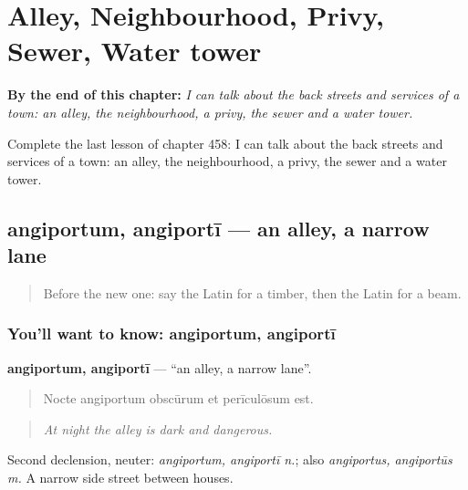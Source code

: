 
\chapter{Alley, Neighbourhood, Privy, Sewer, Water tower}
\label{ch:la-alley-neighbourhood-privy-sewer-water-tower}

\begin{chapteropening}
\textbf{By the end of this chapter:} \emph{I can talk about the back streets and services of a town: an alley, the neighbourhood, a privy, the sewer and a water tower.}

Complete the last lesson of chapter 458: I can talk about the back streets and services of a town: an alley, the neighbourhood, a privy, the sewer and a water tower.
\end{chapteropening}

\section[angiportum, angiportī]{angiportum, angiportī — an alley, a narrow lane}

\label{lesson:LA-C458-angiportum}



\begin{quote}
Before the new one: say the Latin for a timber, then the Latin for a beam.
\end{quote}

\subsection*{You'll want to know: angiportum, angiportī}
\textbf{angiportum, angiportī} — \textquotedblleft{}an alley, a narrow lane\textquotedblright{}.

\begin{quote}
Nocte angiportum obscūrum et perīculōsum est.
\end{quote}

\begin{quote}
\emph{At night the alley is dark and dangerous.}
\end{quote}

Second declension, neuter: \emph{angiportum, angiportī n.}; also \emph{angiportus, angiportūs m.} A narrow side street between houses.

